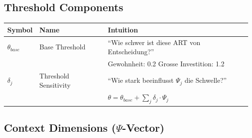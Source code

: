 \subsection{Threshold Components}

\begin{longtable}{p{2cm}p{4cm}p{7cm}}
\toprule
\textbf{Symbol} & \textbf{Name} & \textbf{Intuition} \\
\midrule
\endhead

$\theta_{base}$ & Base Threshold & 
``Wie schwer ist diese ART von Entscheidung?'' \\
& & Gewohnheit: 0.2 \quad Grosse Investition: 1.2 \\[6pt]

$\delta_j$ & Threshold Sensitivity & 
``Wie stark beeinflusst $\Psi_j$ die Schwelle?'' \\
& & $\theta = \theta_{base} + \sum_j \delta_j \cdot \Psi_j$ \\[6pt]

\bottomrule
\end{longtable}

\subsection{Context Dimensions ($\Psi$-Vector)}

